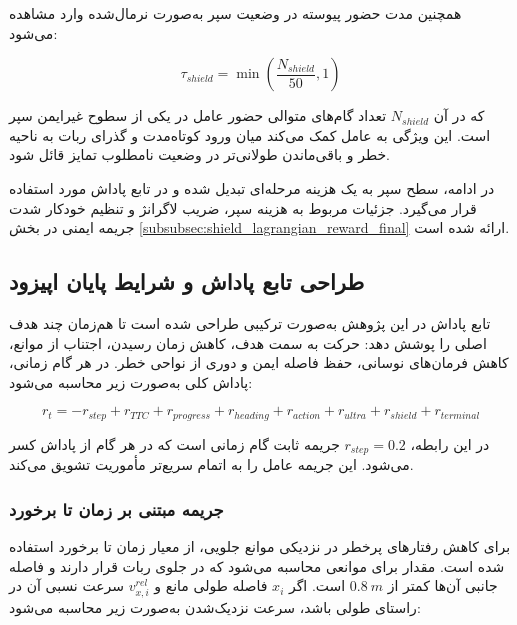 همچنین مدت حضور پیوسته در وضعیت سپر به‌صورت نرمال‌شده وارد مشاهده می‌شود:

\begin{equation}
	\tau_{shield} =
	\min
	\left(
	\frac{N_{shield}}{50},
	1
	\right)
	\label{eq:shield_duration_encoding_final}
\end{equation}

که در آن \(N_{shield}\) تعداد گام‌های متوالی حضور عامل در یکی از سطوح غیرایمن سپر است. این ویژگی به عامل کمک می‌کند میان ورود کوتاه‌مدت و گذرای ربات به ناحیه خطر و باقی‌ماندن طولانی‌تر در وضعیت نامطلوب تمایز قائل شود.

در ادامه، سطح سپر به یک هزینه مرحله‌ای تبدیل شده و در تابع پاداش مورد استفاده قرار می‌گیرد. جزئیات مربوط به هزینه سپر، ضریب لاگرانژ
 و تنظیم خودکار شدت جریمه ایمنی در بخش \ref{subsubsec:shield_lagrangian_reward_final} ارائه شده است.

\subsection{طراحی تابع پاداش و شرایط پایان اپیزود}
\label{subsec:reward_design_final}

تابع پاداش در این پژوهش به‌صورت ترکیبی طراحی شده است تا هم‌زمان چند هدف اصلی را پوشش دهد: حرکت به سمت هدف، کاهش زمان رسیدن، اجتناب از موانع، کاهش فرمان‌های نوسانی، حفظ فاصله ایمن و دوری از نواحی خطر. در هر گام زمانی، پاداش کلی به‌صورت زیر محاسبه می‌شود:

\begin{equation}
	r_t =
	-r_{step}
	+r_{TTC}
	+r_{progress}
	+r_{heading}
	+r_{action}
	+r_{ultra}
	+r_{shield}
	+r_{terminal}
	\label{eq:total_reward_final}
\end{equation}

در این رابطه، \(r_{step}=0.2\) جریمه ثابت گام زمانی است که در هر گام از پاداش کسر می‌شود. این جریمه عامل را به اتمام سریع‌تر مأموریت تشویق می‌کند.

\subsubsection{جریمه مبتنی بر زمان تا برخورد}
\label{subsubsec:ttc_reward_final}

برای کاهش رفتارهای پرخطر در نزدیکی موانع جلویی، از معیار زمان تا برخورد%
 استفاده شده است. مقدار  برای موانعی محاسبه می‌شود که در جلوی ربات قرار دارند و فاصله جانبی آن‌ها کمتر از \(0.8~m\) است. اگر \(x_i\) فاصله طولی مانع و \(v^{rel}_{x,i}\) سرعت نسبی آن در راستای طولی باشد، سرعت نزدیک‌شدن به‌صورت زیر محاسبه می‌شود:


